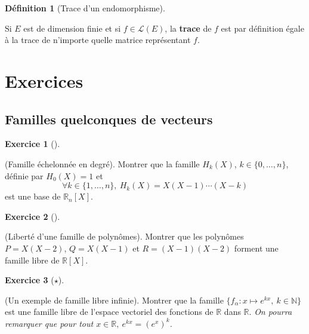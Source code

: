 \documentclass[
  french,
  letterpaper,
  DIV=11,
  numbers=noendperiod]{scrreprt}
\theoremstyle{plain}
\theoremstyle{definition}
\newtheorem{definition}{Définition}[chapter]
\theoremstyle{plain}
\theoremstyle{plain}
\theoremstyle{definition}
\newtheorem{exercise}{Exercice}[chapter]
\theoremstyle{definition}
\theoremstyle{plain}
\theoremstyle{remark}
\begin{document}
\begin{definition}[Trace d'un
endomorphisme]\protect\hypertarget{def-trace-endo}{}\label{def-trace-endo}

Si \(E\) est de dimension finie et si \(f \in \mathcal{L}(E)\), la
\textbf{trace} de \(f\) est par définition égale à la trace de n'importe
quelle matrice représentant \(f\).

\end{definition}

\newpage

\section*{Exercices}\label{exercices-2}


\subsection{Familles quelconques de
vecteurs}\label{familles-quelconques-de-vecteurs}

\begin{exercise}[]\protect\hypertarget{exr-03-base}{}\label{exr-03-base}

(Famille échelonnée en degré). Montrer que la famille \(H_k(X)\),
\(k\in\{0,\dots,n\}\), définie par \(H_0(X)=1\) et
\[\forall k\in\{1,\dots,n\},\
H_k(X) = X(X-1)\cdots(X-k)\] est une base de \(\mathbb{R}_n[X]\).

\end{exercise}

\begin{exercise}[]\protect\hypertarget{exr-03-libre}{}\label{exr-03-libre}

(Liberté d'une famille de polynômes). Montrer que les polynômes
\(P=X(X-2)\), \(Q=X(X-1)\) et \(R=(X-1)(X-2)\) forment une famille libre
de \(\mathbb{R}[X]\).

\end{exercise}

\begin{exercise}[\(\star\)]\protect\hypertarget{exr-03-libre-inf}{}\label{exr-03-libre-inf}

(Un exemple de famille libre infinie). Montrer que la famille
\(\{f_{\alpha}:x\mapsto
e^{kx},\ k\in\mathbb{N} \}\) est une famille libre de l'espace vectoriel
des fonctions de \(\mathbb{R}\) dans \(\mathbb{R}\). \emph{On pourra
remarquer que pour tout \(x \in \mathbb{R},\ e^{kx}=(e^x)^k\).}

\end{exercise}
\end{document}
